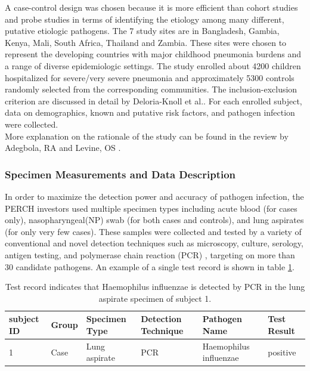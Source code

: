 \documentclass[11 pt, a4paper]{article}  %
\begin{document}
A case-control design was chosen because it is more efficient than cohort studies and probe studies in terms of identifying the etiology among many different, putative etiologic pathogens. The 7 study sites are in Bangladesh, Gambia, Kenya, Mali, South Africa, Thailand and Zambia. These sites were chosen to represent the developing countries with major childhood pneumonia burdens and a range of diverse epidemiologic settings. The study enrolled about 4200 children hospitalized for severe/very severe pneumonia and approximately 5300 controls randomly selected from the corresponding communities. The inclusion-exclusion criterion are discussed in detail by Deloria-Knoll et al.\cite{deloria2012identification}. For each enrolled subject, data on demographics, known and putative risk factors, and pathogen infection were collected. \\

More explanation on the rationale of the study can be found in the review by Adegbola, RA and Levine, OS \cite{adegbola2011rationale}. 

\subsubsection*{Specimen Measurements and Data Description}
In order to maximize the detection power and accuracy of pathogen infection, the PERCH investors used multiple specimen types \cite{hammitt2012specimen} including acute blood (for cases only), nasopharyngeal(NP) swab (for both cases and controls), and lung aspirates (for only very few cases). These samples were collected and tested by a variety of conventional and novel detection techniques such as microscopy, culture, serology, antigen testing, and polymerase chain reaction (PCR) \cite{murdoch2012laboratory}, targeting on more than $30$ candidate pathogens. An example of a single test record is shown in table \ref{test_eg}. 
\begin{table}[h]
\centering
\caption{Test record indicates that Haemophilus influenzae is detected by PCR in the lung aspirate specimen of subject 1.}
\label{test_eg}
\begin{tabular}{llllll}
\hline
subject ID & Group & Specimen Type & Detection Technique & Pathogen Name          & Test Result \\ \hline
1          & Case  & Lung aspirate & PCR                 & Haemophilus influenzae & positive           \\ \hline
\end{tabular}
\end{table}
\end{document}
